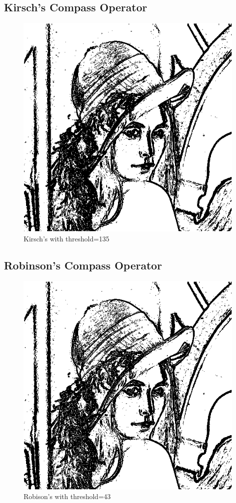 \documentclass{article}
\begin{document}
\subsection{Kirsch's Compass Operator}
\begin{figure}[H]
  \includegraphics[width=\linewidth]{img/kirsch_135.png}
  \caption{Kirsch's with threshold=135}
  \label{fig:kirsch_135}
\end{figure}

\subsection{Robinson's Compass Operator}
\begin{figure}[H]
  \includegraphics[width=\linewidth]{img/robinson_43.png}
  \caption{Robison's with threshold=43}
  \label{fig:robinson_43}
\end{figure}
\end{document}
